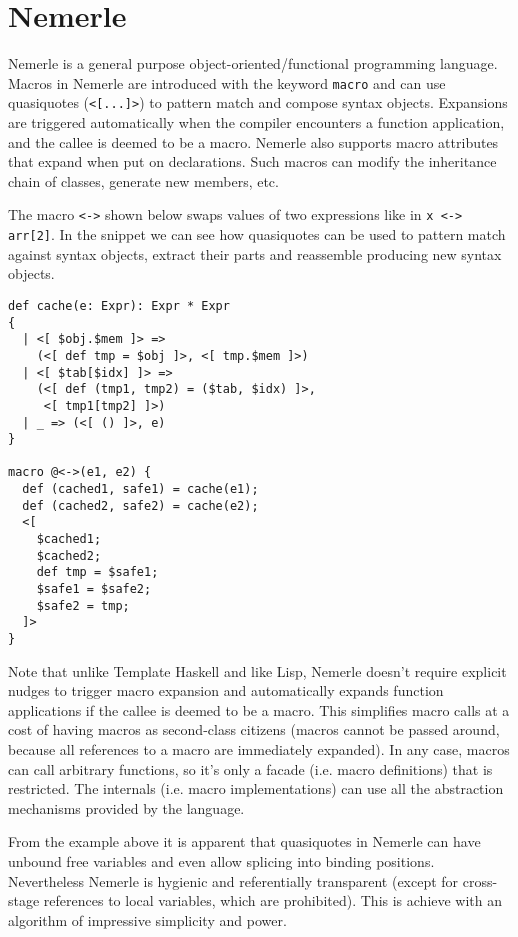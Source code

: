 \documentclass[10pt,journal,a4paper]{IEEEtran}
\begin{document}
\section{Nemerle}

Nemerle is a general purpose object-oriented/functional programming language.
Macros in Nemerle are introduced with the keyword \small \texttt{macro} \normalsize
and can use quasiquotes (\small \texttt{<[...]>}\normalsize) to pattern match
and compose syntax objects. Expansions are triggered automatically when
the compiler encounters a function application, and the callee is deemed to be a macro.
Nemerle also supports macro attributes that expand when put on declarations.
Such macros can modify the inheritance chain of classes, generate new members, etc.

The macro \small \texttt{<->} \normalsize shown below swaps values of two expressions
like in \small \texttt{x <-> arr[2]}\normalsize. In the snippet we can see how quasiquotes
can be used to pattern match against syntax objects, extract their parts and reassemble
producing new syntax objects.

\small
\begin{verbatim}
def cache(e: Expr): Expr * Expr
{
  | <[ $obj.$mem ]> =>
    (<[ def tmp = $obj ]>, <[ tmp.$mem ]>)
  | <[ $tab[$idx] ]> =>
    (<[ def (tmp1, tmp2) = ($tab, $idx) ]>,
     <[ tmp1[tmp2] ]>)
  | _ => (<[ () ]>, e)
}

macro @<->(e1, e2) {
  def (cached1, safe1) = cache(e1);
  def (cached2, safe2) = cache(e2);
  <[
    $cached1;
    $cached2;
    def tmp = $safe1;
    $safe1 = $safe2;
    $safe2 = tmp;
  ]>
}
\end{verbatim}
\normalsize

Note that unlike Template Haskell and like Lisp, Nemerle
doesn't require explicit nudges to trigger macro expansion
and automatically expands function applications if the callee is deemed to be a macro.
This simplifies macro calls at a cost of having macros as second-class citizens
(macros cannot be passed around, because all references to a macro are immediately expanded).
In any case, macros can call arbitrary functions, so it's only a facade (i.e. macro definitions)
that is restricted. The internals (i.e. macro implementations) can use all the abstraction mechanisms
provided by the language.

From the example above it is apparent that quasiquotes in Nemerle
can have unbound free variables and even allow splicing into binding positions.
Nevertheless Nemerle is hygienic and referentially transparent (except for cross-stage
references to local variables, which are prohibited). This is achieve with
an algorithm of impressive simplicity and power.
\end{document}
